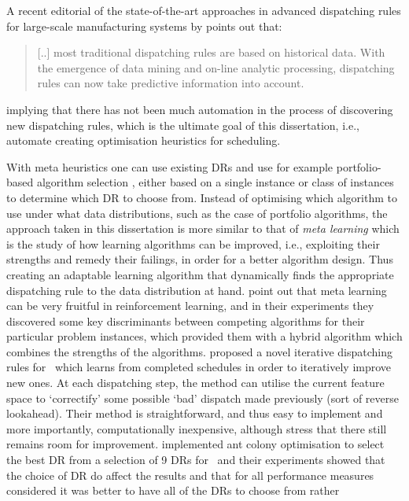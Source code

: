A recent editorial of the state-of-the-art approaches in advanced dispatching rules for large-scale manufacturing systems by \citet{Chen13} points out that:
\begin{quote}
	[..] most traditional dispatching rules are based on historical data. With the emergence of data mining and on-line analytic processing, dispatching rules can now take predictive information into account.
\end{quote}
implying that there has not been much automation in the process of discovering new dispatching rules, which is the ultimate goal of this dissertation, i.e., automate creating optimisation heuristics for scheduling. 

With meta heuristics one can use existing DRs and use for example 
{portfolio-based algorithm selection} \citep{Rice76,Gomes01}, either based 
on a single instance or class of instances \citep{Xu07} to determine which DR 
to choose from. 
Instead of optimising which algorithm to use under what data distributions, 
such as the case of portfolio algorithms, the approach taken in this 
dissertation is more similar to that of \emph{meta learning} \citep{Vilalta02} 
which is the study of how learning algorithms can be improved, i.e., exploiting 
their strengths and remedy their failings, in order for a better algorithm 
design. Thus creating an adaptable learning algorithm that dynamically finds 
the appropriate dispatching rule  to the data distribution at hand. 
\citet{Kalyanakrishnan11} point out that meta learning can be very fruitful in 
reinforcement learning, and in their experiments they discovered some key 
discriminants between competing algorithms for their particular problem 
instances, which provided them with a hybrid algorithm which combines the 
strengths of the algorithms.
\citet{Nguyen13} proposed a novel {iterative dispatching rules} for \JSP\ 
which learns from completed schedules in order to iteratively improve new ones. 
At each dispatching step, the method can utilise the current feature space to 
`correctify' some possible `bad' dispatch made previously (sort of reverse 
lookahead). Their method is straightforward, and thus easy to implement and 
more importantly, computationally inexpensive, although \citeauthor{Nguyen13} 
stress that there still remains room for improvement. 
\citet{Korytkowski13} implemented {ant colony optimisation} to select the 
best DR from a selection of 9 DRs for \JSP\ and their experiments showed 
that the choice of DR do affect the results and that for all performance 
measures considered it was better to have all of the DRs to choose from rather 
